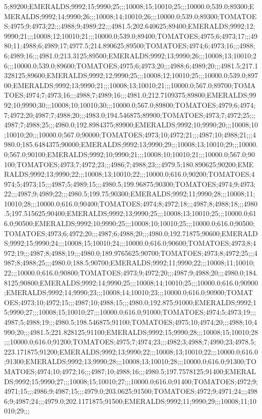 5;89200;EMERALDS;9992;15;9990;25;;;10008;15;10010;25;;;10000.0;539.0;89300;EMERALDS;9992;14;9990;26;;;10008;14;10010;26;;;10000.0;539.0;89300;TOMATOES;4975;9;4973;22;;;4988;9;4989;22;;;4981.5;202.640625;89400;EMERALDS;9992;12;9990;21;;;10008;12;10010;21;;;10000.0;539.0;89400;TOMATOES;4975;6;4973;17;;;4980;11;4988;6;4989;17;4977.5;214.890625;89500;TOMATOES;4974;6;4973;16;;;4988;6;4989;16;;;4981.0;213.3125;89500;EMERALDS;9992;13;9990;26;;;10008;13;10010;26;;;10000.0;539.0;89600;TOMATOES;4975;6;4973;20;;;4988;6;4989;20;;;4981.5;217.1328125;89600;EMERALDS;9992;12;9990;25;;;10008;12;10010;25;;;10000.0;539.0;89700;EMERALDS;9992;13;9990;21;;;10008;13;10010;21;;;10000.0;567.0;89700;TOMATOES;4974;7;4973;16;;;4988;7;4989;16;;;4981.0;212.7109375;89800;EMERALDS;9992;10;9990;30;;;10008;10;10010;30;;;10000.0;567.0;89800;TOMATOES;4979;6;4974;7;4972;20;4987;7;4988;20;;;4983.0;194.546875;89900;TOMATOES;4973;7;4972;25;;;4987;7;4988;25;;;4980.0;192.8984375;89900;EMERALDS;9992;10;9990;20;;;10008;10;10010;20;;;10000.0;567.0;90000;TOMATOES;4973;10;4972;21;;;4987;10;4988;21;;;4980.0;185.6484375;90000;EMERALDS;9992;13;9990;29;;;10008;13;10010;29;;;10000.0;567.0;90100;EMERALDS;9992;10;9990;21;;;10008;10;10010;21;;;10000.0;567.0;90100;TOMATOES;4973;7;4972;23;;;4986;7;4988;23;;;4979.5;180.890625;90200;EMERALDS;9992;13;9990;22;;;10008;13;10010;22;;;10000.0;616.0;90200;TOMATOES;4974;5;4973;15;;;4987;5;4989;15;;;4980.5;199.96875;90300;TOMATOES;4974;9;4973;22;;;4987;9;4989;22;;;4980.5;199.75;90300;EMERALDS;9992;11;9990;28;;;10008;11;10010;28;;;10000.0;616.0;90400;TOMATOES;4974;8;4972;18;;;4987;8;4988;18;;;4980.5;197.515625;90400;EMERALDS;9992;13;9990;25;;;10008;13;10010;25;;;10000.0;616.0;90500;EMERALDS;9992;10;9990;25;;;10008;10;10010;25;;;10000.0;616.0;90500;TOMATOES;4973;6;4972;20;;;4987;6;4988;20;;;4980.0;192.71875;90600;EMERALDS;9992;15;9990;24;;;10008;15;10010;24;;;10000.0;616.0;90600;TOMATOES;4973;8;4972;19;;;4987;8;4988;19;;;4980.0;189.9765625;90700;TOMATOES;4973;8;4972;25;;;4987;8;4988;25;;;4980.0;188.5;90700;EMERALDS;9992;11;9990;22;;;10008;11;10010;22;;;10000.0;616.0;90800;TOMATOES;4973;9;4972;20;;;4987;9;4988;20;;;4980.0;184.8125;90800;EMERALDS;9992;14;9990;25;;;10008;14;10010;25;;;10000.0;616.0;90900;EMERALDS;9992;14;9990;23;;;10008;14;10010;23;;;10000.0;616.0;90900;TOMATOES;4973;10;4972;15;;;4987;10;4988;15;;;4980.0;192.875;91000;EMERALDS;9992;15;9990;27;;;10008;15;10010;27;;;10000.0;616.0;91000;TOMATOES;4974;5;4973;19;;;4987;5;4988;19;;;4980.5;198.546875;91100;TOMATOES;4975;10;4974;20;;;4988;10;4990;20;;;4981.5;221.828125;91100;EMERALDS;9992;15;9990;28;;;10008;15;10010;28;;;10000.0;616.0;91200;TOMATOES;4975;7;4974;23;;;4982;3;4988;7;4990;23;4978.5;223.171875;91200;EMERALDS;9992;13;9990;22;;;10008;13;10010;22;;;10000.0;616.0;91300;EMERALDS;9992;13;9990;28;;;10008;13;10010;28;;;10000.0;616.0;91300;TOMATOES;4974;10;4972;16;;;4987;10;4988;16;;;4980.5;197.7578125;91400;EMERALDS;9992;15;9990;27;;;10008;15;10010;27;;;10000.0;616.0;91400;TOMATOES;4972;9;4971;15;;;4986;9;4987;15;;;4979.0;203.0625;91500;TOMATOES;4972;9;4971;24;;;4986;9;4987;24;;;4979.0;202.1171875;91500;EMERALDS;9992;11;9990;29;;;10008;11;10010;29;;;